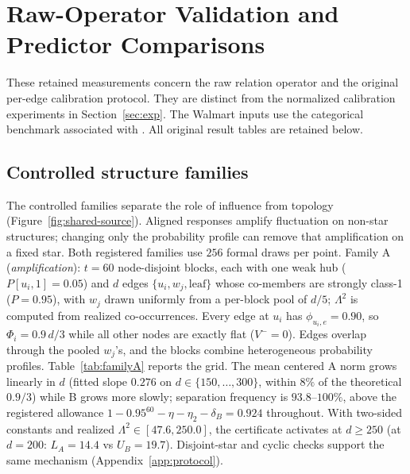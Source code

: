 \documentclass[preprint,11pt]{elsarticle}
\begin{document}
\section{Raw-Operator Validation and Predictor Comparisons}\label{sec:raw-validation}
These retained measurements concern the raw relation operator and the original per-edge calibration protocol. They are distinct from the normalized calibration experiments in Section~\ref{sec:exp}. The Walmart inputs use the categorical benchmark associated with \cite{amburg2020categorical}. All original result tables are retained below.

\subsection{Controlled structure families}\label{sec:families}

The controlled families separate the role of influence from topology
(Figure~\ref{fig:shared-source}). Aligned responses amplify fluctuation
on non-star structures; changing only the probability profile can
remove that amplification on a fixed star. Both registered families
use $256$ formal draws per point. Family A
(\emph{amplification}): $t=60$ node-disjoint blocks, each with one weak
hub ($P[u_i,1]=0.05$) and $d$ edges $\{u_i,w_j,\text{leaf}\}$ whose
co-members are strongly class-1 ($P=0.95$), with $w_j$ drawn uniformly
from a per-block pool of $d/5$; $\Lambda^2$ is computed from realized
co-occurrences. Every edge
at $u_i$ has $\phi_{u_i,e}=0.90$, so $\Phi_i=0.9\,d/3$ while all other
nodes are exactly flat ($V^-=0$). Edges overlap through the pooled
$w_j$'s, and the blocks combine heterogeneous probability profiles.
Table~\ref{tab:familyA} reports the grid. The mean centered A norm
grows linearly in $d$ (fitted slope $0.276$ on $d\in\{150,\dots,300\}$,
within $8\%$ of the theoretical $0.9/3$) while B grows more slowly;
separation frequency is $93.8$--$100\%$, above the registered
allowance $1-0.95^{60}-\eta-\eta_2-\delta_B=0.924$ throughout. With
two-sided constants and realized $\Lambda^2\in[47.6,250.0]$, the
certificate activates at $d\ge250$ (at $d=200$: $L_A=14.4$ vs
$U_B=19.7$). Disjoint-star and cyclic checks support the same
mechanism (Appendix~\ref{app:protocol}).
\end{document}

